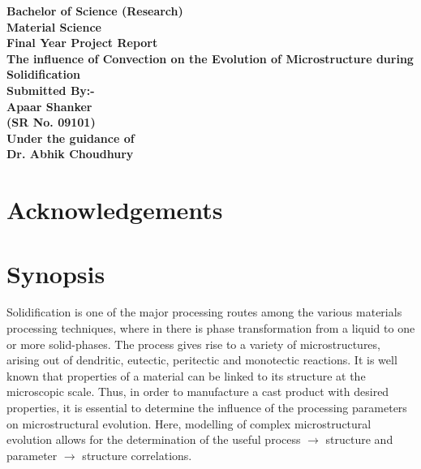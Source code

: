 \documentclass[a4paper]{report}
\begin{document}
\begin{titlepage}
\centering
\vspace{20pt}
\Large
\bfseries
Bachelor of Science (Research)\\
Material Science\\
\normalfont
\Large
\vspace{10pt}
Final Year Project Report\\
\vspace{100pt}
\LARGE
\bfseries
The influence of Convection on the Evolution of Microstructure 
during Solidification\\
\normalfont
\Large
\vspace{100pt}
Submitted By:-\\
Apaar Shanker\\
(SR No. 09101)\\
\vspace{20pt}
Under the guidance of\\ 
Dr. Abhik Choudhury
\end{titlepage}

{}
\tableofcontents

\chapter*{Acknowledgements}


\chapter{Synopsis}

Solidification is one of the major processing routes among the various materials processing 
techniques, where in there is phase transformation from a liquid to one or more solid-phases. 
The process gives rise to a variety of microstructures, arising out of dendritic, eutectic, peritectic and
monotectic reactions. It is well known that properties of a material can be linked to its structure
at the microscopic scale. Thus, in order to manufacture a cast product with desired properties, it is 
essential to determine the influence of the processing parameters on microstructural evolution.
Here, modelling of complex microstructural evolution allows for the determination of 
the useful process $\rightarrow$ structure and parameter $\rightarrow$ structure correlations.\\
\end{document}
